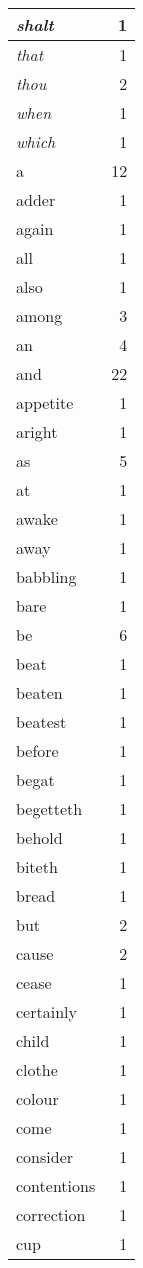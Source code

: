 \begin{center}
\begin{longtable}{l|r}
\emph{shalt} & 1\\ \hline 
\emph{that} & 1\\ \hline 
\emph{thou} & 2\\ \hline 
\emph{when} & 1\\ \hline 
\emph{which} & 1\\ \hline 
a & 12\\ \hline 
adder & 1\\ \hline 
again & 1\\ \hline 
all & 1\\ \hline 
also & 1\\ \hline 
among & 3\\ \hline 
an & 4\\ \hline 
and & 22\\ \hline 
appetite & 1\\ \hline 
aright & 1\\ \hline 
as & 5\\ \hline 
at & 1\\ \hline 
awake & 1\\ \hline 
away & 1\\ \hline 
babbling & 1\\ \hline 
bare & 1\\ \hline 
be & 6\\ \hline 
beat & 1\\ \hline 
beaten & 1\\ \hline 
beatest & 1\\ \hline 
before & 1\\ \hline 
begat & 1\\ \hline 
begetteth & 1\\ \hline 
behold & 1\\ \hline 
biteth & 1\\ \hline 
bread & 1\\ \hline 
but & 2\\ \hline 
cause & 2\\ \hline 
cease & 1\\ \hline 
certainly & 1\\ \hline 
child & 1\\ \hline 
clothe & 1\\ \hline 
colour & 1\\ \hline 
come & 1\\ \hline 
consider & 1\\ \hline 
contentions & 1\\ \hline 
correction & 1\\ \hline 
cup & 1\\ \hline 

\end{longtable}
\end{center}
